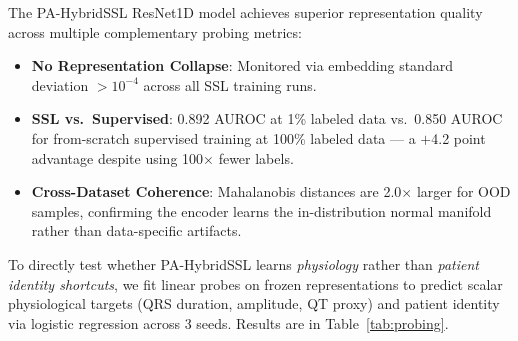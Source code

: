 \documentclass[journal,10pt]{IEEEtran}
\begin{document}
The PA-HybridSSL ResNet1D model achieves superior representation quality across multiple complementary probing metrics:
\begin{itemize}
    \item \textbf{No Representation Collapse}: Monitored via embedding standard deviation $>10^{-4}$ across all SSL training runs.
    \item \textbf{SSL vs.\ Supervised}: 0.892 AUROC at 1\% labeled data vs.\ 0.850 AUROC for from-scratch supervised training at 100\% labeled data --- a $+$4.2 point advantage despite using 100$\times$ fewer labels.
    \item \textbf{Cross-Dataset Coherence}: Mahalanobis distances are 2.0$\times$ larger for OOD samples, confirming the encoder learns the in-distribution normal manifold rather than data-specific artifacts.
\end{itemize}

To directly test whether PA-HybridSSL learns \emph{physiology} rather than \emph{patient identity shortcuts}, we fit linear probes on frozen representations to predict scalar physiological targets (QRS duration, amplitude, QT proxy) and patient identity via logistic regression across 3 seeds. Results are in Table~\ref{tab:probing}.

\begin{table}[h]
\centering
\caption{Physiological feature probing: linear R$^2$ for predicting ECG-derived features from frozen representations (mean\,$\pm$\,std, 3 seeds). ECG-derived physiology is inherently entangled with patient identity (each individual has a characteristic QRS signature), which explains why both models show elevated patient ID accuracy. Critically, PA-HybridSSL simultaneously achieves strictly higher R$^2$ across all three clinical morphology targets.}
\label{tab:probing}
\end{table}
\end{document}

